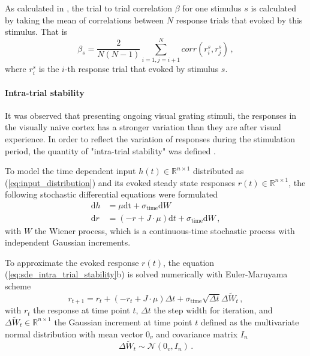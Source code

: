 \documentclass[11pt]{article}
\begin{document}
	As calculated in \cite{tragenap2023nature}, the trial to trial correlation $\beta$ for one stimulus $s$ is calculated by taking the mean of correlations between $N$ response trials that evoked by this stimulus. That is
		\begin{equation} \label{eq:ttc_sym}
			\beta_s = \frac{2}{N(N-1)} \sum_{i = 1, j = i+1}^{N} corr(r_i^s, r_j^s) \, ,
		\end{equation}
	where $r_i^s$ is the $i$-th response trial that evoked by stimulus $s$. 
	
	\paragraph{Intra-trial stability}
	
	It was observed that presenting ongoing visual grating stimuli, the responses in the visually naive cortex has a stronger variation than they are after visual experience. In order to reflect the variation of responses during the stimulation period, the quantity of "intra-trial stability" was defined \cite{tragenap2023nature}. 
	
	To model the time dependent input $h(t) \in \mathbb{R}^{n \times 1}$ distributed as (\ref{eq:input_distribution}) and its evoked steady state responses $r(t) \in \mathbb{R}^{n \times 1}$, the following stochastic differential equations were formulated
		\begin{subequations} \label{eq:sde_intra_trial_stability}
			\begin{align}
				\mathrm{d} h & = \mu \mathrm{dt} + \sigma_{\text{time}} \mathrm{d} W \\
				\mathrm{d} r & = (-r + J \cdot \mu) \mathrm{d}t + \sigma_{\text{time}} \mathrm{d} W \, ,
			\end{align}
		\end{subequations}
	with $W$ the Wiener process, which is a continuous-time stochastic process with independent Gaussian increments. 
	
	To approximate the evoked response $r(t)$, the equation (\ref{eq:sde_intra_trial_stability}b) is solved numerically with Euler-Maruyama scheme 
		\begin{equation}
			r_{t+1} = r_t + (-r_t + J \cdot \mu) \Delta t + \sigma_{\text{time}} \sqrt{\Delta t} \Delta \tilde{W}_t \, ,
		\end{equation}
	with $r_t$ the response at time point $t$, $\Delta t$ the step width for iteration, and $\Delta \tilde{W}_t \in \mathbb{R}^{n \times 1}$ the Gaussian increment at time point $t$ defined as the multivariate normal distribution with mean vector $0_v$ and covariance matrix $I_n$
		\begin{equation}
			\Delta \tilde{W}_t \sim \mathcal{N}(0_v, I_n) \, .
		\end{equation}
	
\end{document}
